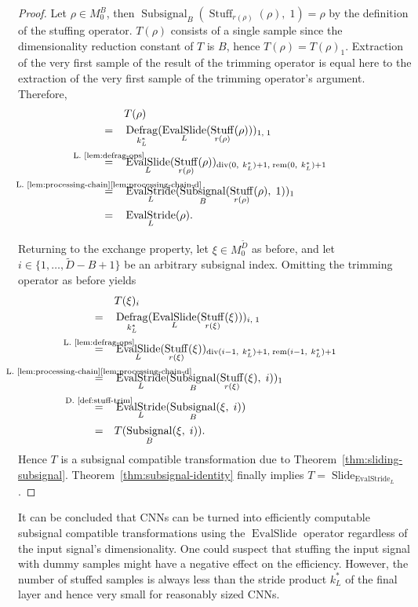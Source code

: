 \documentclass[journal]{IEEEtran}
\newcommand{\ROI}{B}
\newcommand{\discint}[2]{\{#1,\dotsc,#2\}}
\newcommand{\inint}[2]{\in\discint{#1}{#2}}
\DeclareMathOperator{\Subsignal}{Subsignal}
\DeclareMathOperator{\Slide}{Slide}
\DeclareMathOperator{\Defragmentation}{Defrag}
\DeclareMathOperator{\EvalStride}{EvalStride}
\DeclareMathOperator{\EvalSlide}{EvalSlide}
\DeclareMathOperator{\Stuffing}{Stuff}
\renewcommand{\div}[2]{\operatorname{div}(#1,\ #2)}
\newcommand{\rem}[2]{\operatorname{rem}(#1,\ #2)}
\newcommand{\equsing}[1]{\overset{\mathclap{\text{#1}}}{=}}
\begin{document}
\begin{proof}
Let $\rho\in M_0^\ROI$, then $\Subsignal_\ROI(\Stuffing_{r(\rho)}(\rho),\;1) = \rho$ by the definition of the stuffing operator.
$T(\rho)$ consists of a single sample since the dimensionality reduction constant of $T$ is $\ROI$, hence $T(\rho) = T(\rho)_1$.
Extraction of the very first sample of the result of the trimming operator is equal here to the extraction of the very first sample of the trimming operator's argument.
Therefore,
\begin{align*}
  & T(\rho)\\
  =\ \ \ &\Defragmentation_{k_L^*}( \EvalSlide_L( \Stuffing_{r(\rho)}(\rho) ) )_{1,\;1}\\
  \equsing{L.~\ref{lem:defrag-ops}}\ \ \ &\EvalSlide_L( \Stuffing_{r(\rho)}(\rho) )_{\div{0}{k_L^*} + 1,\;\rem{0}{k_L^*} + 1}\\
  \equsing{L.~\ref{lem:processing-chain}\ref{lem:processing-chain-d}}\ \ \ &\EvalStride_L(\Subsignal_\ROI(\Stuffing_{r(\rho)}(\rho),\; 1))_1\\
  =\ \ \ &\EvalStride_L(\rho)\text{.}
\end{align*}

Returning to the exchange property, let $\xi\in M_0^{\tilde{D}}$ as before, and let $i\inint{1}{\tilde{D} - \ROI + 1}$ be an arbitrary subsignal index.
Omitting the trimming operator as before yields
\begin{align*}
  & T(\xi)_i\\
  =\ \ \ & \Defragmentation_{k_L^*}( \EvalSlide_L( \Stuffing_{r(\xi)}(\xi) ) )_{i,\;1}\\
  \equsing{L.~\ref{lem:defrag-ops}}\ \ \ & \EvalSlide_L( \Stuffing_{r(\xi)}(\xi) )_{\div{i - 1}{k_L^*} + 1,\;\rem{i - 1}{k_L^*} + 1}\\
  \equsing{L.~\ref{lem:processing-chain}\ref{lem:processing-chain-d}}\ \ \ & \EvalStride_L(\Subsignal_\ROI(\Stuffing_{r(\xi)}(\xi),\; i))_1\\
  \equsing{D.~\ref{def:stuff-trim}}\ \ \ & \EvalStride_L(\Subsignal_\ROI(\xi,\; i))\\
  =\ \ \ & T(\Subsignal_\ROI(\xi,\;i))\text{.}
\end{align*}
Hence $T$ is a subsignal compatible transformation due to Theorem~\ref{thm:sliding-subsignal}.
Theorem~\ref{thm:subsignal-identity} finally implies $T = \Slide_{\EvalStride_L}$.
\end{proof}

It can be concluded that CNNs can be turned into efficiently computable subsignal compatible transformations using the $\EvalSlide$ operator regardless of the input signal's dimensionality.
One could suspect that stuffing the input signal with dummy samples might have a negative effect on the efficiency.
However, the number of stuffed samples is always less than the stride product $k_L^*$ of the final layer and hence very small for reasonably sized CNNs.
\end{document}
